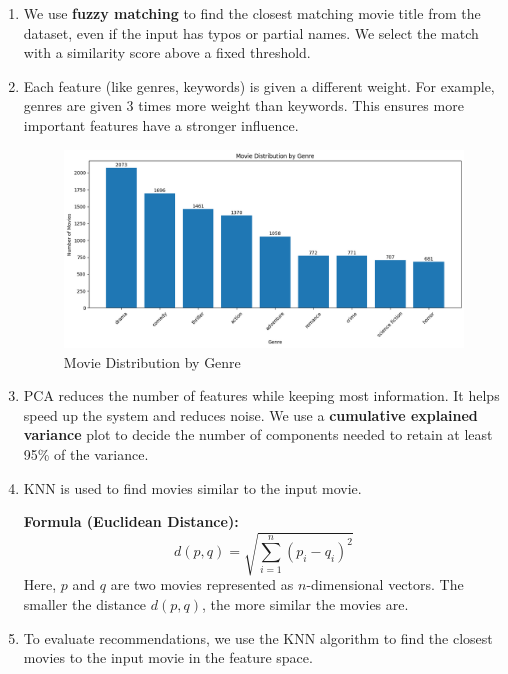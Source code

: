 \documentclass[a4paper]{article}
\theoremstyle{plain}
\begin{document}
\begin{enumerate}
    \item We use \textbf{fuzzy matching} to find the closest matching movie title from the dataset, even if the input has typos or partial names. We select the match with a similarity score above a fixed threshold.

    \item Each feature (like genres, keywords) is given a different weight. For example, genres are given 3 times more weight than keywords. This ensures more important features have a stronger influence.

\begin{figure}[H]
    \centering
    \includegraphics[width=\linewidth]{genre.png}
    \caption{Movie Distribution by Genre}
    \label{Figure 3}
\end{figure}

    \item PCA reduces the number of features while keeping most information. It helps speed up the system and reduces noise. We use a \textbf{cumulative explained variance} plot to decide the number of components needed to retain at least 95\% of the variance.

    \item KNN is used to find movies similar to the input movie.

    \textbf{Formula (Euclidean Distance):}
    \[
    d(p, q) = \sqrt{\sum_{i=1}^{n} (p_i - q_i)^2}
    \]
    Here, $p$ and $q$ are two movies represented as $n$-dimensional vectors. The smaller the distance $d(p, q)$, the more similar the movies are.

    

    \item To evaluate recommendations, we use the KNN algorithm to find the closest movies to the input movie in the feature space.
\end{enumerate}
\end{document}
